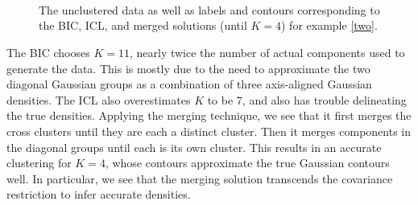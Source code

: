 \documentclass{uwstat572}
\renewcommand\;{\,}
\begin{document}
\begin{figure}
\begin{center}
\\ \vspace{-1em}
\\ \vspace{-1em}
\\ \vspace{-1em}
\end{center}
\vspace{-1em}
\caption{
The unclustered data as well as labels and contours corresponding to the BIC, ICL, and merged solutions (until $K = 4$) for example \ref{two}.}
\label{Example2}
\end{figure}

The BIC chooses $K = 11$, nearly twice the number of actual components used to generate the data.
This is mostly due to the need to approximate the two diagonal Gaussian groups as a combination of three axis-aligned Gaussian densities.
The ICL also overestimates $K$ to be 7, and also has trouble delineating the true densities.
Applying the merging technique, we see that it first merges the cross clusters until they are each a distinct cluster.
Then it merges components in the diagonal groups until each is its own cluster.
This results in an accurate clustering for $K = 4$, whose contours approximate the true Gaussian contours well.
In particular, we see that the merging solution transcends the covariance restriction to infer accurate densities. 
\end{document}

